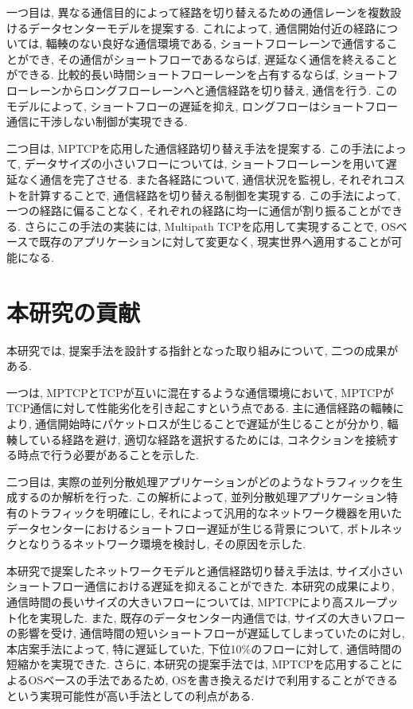 一つ目は, 異なる通信目的によって経路を切り替えるための通信レーンを複数設けるデータセンターモデルを提案する. 
これによって, 通信開始付近の経路については, 輻輳のない良好な通信環境である, ショートフローレーンで通信することができ,
その通信がショートフローであるならば, 遅延なく通信を終えることができる. 
比較的長い時間ショートフローレーンを占有するならば, ショートフローレーンからロングフローレーンへと通信経路を切り替え, 通信を行う. 
このモデルによって, ショートフローの遅延を抑え, ロングフローはショートフロー通信に干渉しない制御が実現できる. 

二つ目は, MPTCPを応用した通信経路切り替え手法を提案する. 
この手法によって, データサイズの小さいフローについては, ショートフローレーンを用いて遅延なく通信を完了させる. 
また各経路について, 通信状況を監視し, それぞれコストを計算することで, 通信経路を切り替える制御を実現する. 
この手法によって, 一つの経路に偏ることなく, それぞれの経路に均一に通信が割り振ることができる. 
さらにこの手法の実装には, Multipath TCPを応用して実現することで, OSベースで既存のアプリケーションに対して変更なく,
現実世界へ適用することが可能になる. 

\section{本研究の貢献}
本研究では, 提案手法を設計する指針となった取り組みについて, 二つの成果がある. 

一つは, MPTCPとTCPが互いに混在するような通信環境において, MPTCPがTCP通信に対して性能劣化を引き起こすという点である. 
主に通信経路の輻輳により, 通信開始時にパケットロスが生じることで遅延が生じることが分かり, 輻輳している経路を避け, 適切な経路を選択するためには,
コネクションを接続する時点で行う必要があることを示した. 

二つ目は, 実際の並列分散処理アプリケーションがどのようなトラフィックを生成するのか解析を行った. 
この解析によって, 並列分散処理アプリケーション特有のトラフィックを明確にし, 
それによって汎用的なネットワーク機器を用いたデータセンターにおけるショートフロー遅延が生じる背景について, ボトルネックとなりうるネットワーク環境を検討し,
その原因を示した.

本研究で提案したネットワークモデルと通信経路切り替え手法は, サイズ小さいショートフロー通信における遅延を抑えることができた. 
本研究の成果により, 通信時間の長いサイズの大きいフローについては, MPTCPにより高スループット化を実現した. 
また, 既存のデータセンター内通信では, サイズの大きいフローの影響を受け, 通信時間の短いショートフローが遅延してしまっていたのに対し, 本店案手法によって,
特に遅延していた, 下位10\%のフローに対して, 通信時間の短縮かを実現できた. 
さらに, 本研究の提案手法では, MPTCPを応用することによるOSベースの手法であるため,
OSを書き換えるだけで利用することができるという実現可能性が高い手法としての利点がある. 

